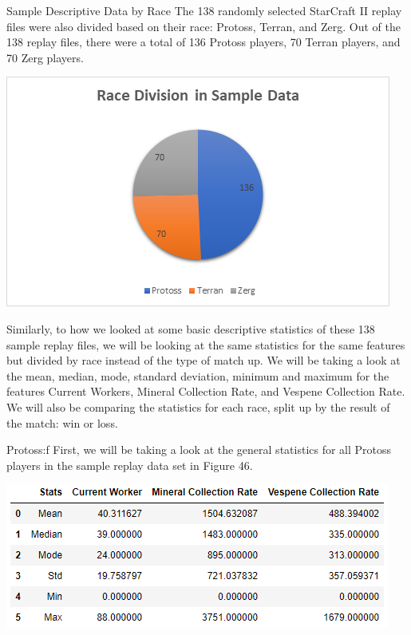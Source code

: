 \documentclass[a4paper,12pt]{report}
\begin{document}
Sample Descriptive Data by Race
The 138 randomly selected StarCraft II replay files were also divided based on their race: Protoss, Terran, and Zerg. Out of the 138 replay files, there were a total of 136 Protoss players, 70 Terran players, and 70 Zerg players. 

\begin{center}
    \captionsetup{type=figure}
    \includegraphics[width=.9\linewidth]{media/RaceDivision.png}
\end{center}

Similarly, to how we looked at some basic descriptive statistics of these 138 sample replay files, we will be looking at the same statistics for the same features but divided by race instead of the type of match up. We will be taking a look at the mean, median, mode, standard deviation, minimum and maximum for the features Current Workers, Mineral Collection Rate, and Vespene Collection Rate. We will also be comparing the statistics for each race, split up by the result of the match: win or loss. 

Protoss:f
First, we will be taking a look at the general statistics for all Protoss players in the sample replay data set in Figure 46. 

\begin{center}
    \captionsetup{type=figure}
    \includegraphics[width=.9\linewidth]{media/ProtossDescriptive.png}
\end{center}
\end{document}

